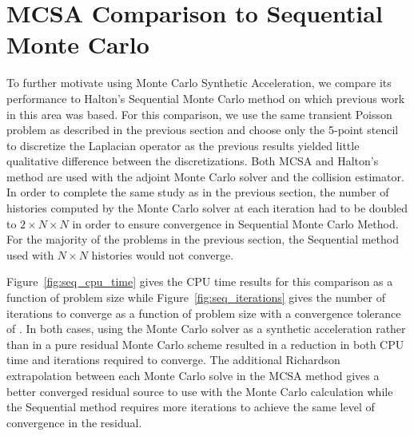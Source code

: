 \section{MCSA Comparison to Sequential Monte Carlo}
\label{subsec:sequential_comparison}
To further motivate using Monte Carlo Synthetic Acceleration, we
compare its performance to Halton's Sequential Monte Carlo method on
which previous work in this area was based. For this comparison, we
use the same transient Poisson problem as described in the previous
section and choose only the 5-point stencil to discretize the
Laplacian operator as the previous results yielded little qualitative
difference between the discretizations. Both MCSA and Halton's method
are used with the adjoint Monte Carlo solver and the collision
estimator. In order to complete the same study as in the previous
section, the number of histories computed by the Monte Carlo solver at
each iteration had to be doubled to $2 \times N \times N$ in order to
ensure convergence in Sequential Monte Carlo Method. For the majority
of the problems in the previous section, the Sequential method used
with $N \times N$ histories would not
converge. 

Figure~\ref{fig:seq_cpu_time} gives the CPU time results for this
comparison as a function of problem size while
Figure~\ref{fig:seq_iterations} gives the number of iterations to
converge as a function of problem size with a convergence tolerance of
. In both cases, using the Monte Carlo solver as a synthetic
acceleration rather than in a pure residual Monte Carlo scheme
resulted in a reduction in both CPU time and iterations required to
converge. The additional Richardson extrapolation between each Monte
Carlo solve in the MCSA method gives a better converged residual
source to use with the Monte Carlo calculation while the Sequential
method requires more iterations to achieve the same level of
convergence in the residual.

